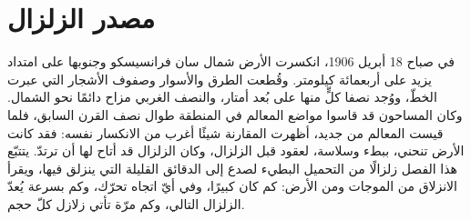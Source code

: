 \chapter{مصدر الزلزال}\label{ch:b1:earthquake-source}

في صباح 18 أبريل 1906، انكسرت الأرض شمال سان فرانسيسكو وجنوبها على امتداد يزيد على أربعمائة كيلومتر. وقُطعت الطرق والأسوار وصفوف الأشجار التي عبرت الخطّ، ووُجد نصفا كلٍّ منها على بُعد أمتار، والنصف الغربي مزاح دائمًا نحو الشمال. وكان المساحون قد قاسوا مواضع المعالم في المنطقة طوال نصف القرن السابق، فلما قيست المعالم من جديد، أظهرت المقارنة شيئًا أغرب من الانكسار نفسه: فقد كانت الأرض تنحني، ببطء وسلاسة، لعقود قبل الزلزال، وكان الزلزال قد أتاح لها أن ترتدّ. يتتبّع هذا الفصل زلزالًا من التحميل البطيء لصدع إلى الدقائق القليلة التي ينزلق فيها، ويقرأ الانزلاق من الموجات ومن الأرض: كم كان كبيرًا، وفي أيّ اتجاه تحرّك، وكم بسرعة يُعدّ الزلزال التالي، وكم مرّة تأتي زلازل كلّ حجم.

